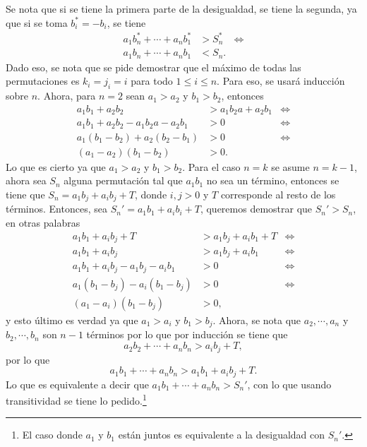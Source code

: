 \documentclass{ayudantia}
\begin{document}
\begin{ans}
    \begin{sol}
        Se nota que si se tiene la primera parte de la desigualdad, se tiene la segunda, ya que si se toma \(b^*_i=-b_i\), se tiene
        \begin{align*}
            a_1b^*_n+\cdots+a_nb^*_1 & >S_n^* & \iff \\
            a_1b_n+\cdots+a_nb_1     & <S_n.
        \end{align*}
        Dado eso, se nota que se pide demostrar que el máximo de todas las permutaciones es \(k_i=j_i=i\) para todo \(1\leq i\leq n\). Para eso, se usará inducción sobre \(n\). Ahora, para \(n=2\) sean \(a_1>a_2\) y \(b_1>b_2\), entonces
        \begin{align*}
            a_1b_1+a_2b_2                & >a_1b_2a+a_2b_1 & \iff \\
            a_1b_1+a_2b_2-a_1b_2a-a_2b_1 & >0              & \iff \\
            a_1(b_1-b_2)+a_2(b_2-b_1)    & >0              & \iff \\
            (a_1-a_2)(b_1-b_2)           & >0.
        \end{align*}
        Lo que es cierto ya que \(a_1>a_2\) y \(b_1>b_2\). Para el caso \(n=k\) se asume \(n=k-1\), ahora sea \(S_n\) alguna permutación tal que \(a_1b_1\) no sea un término, entonces se tiene que \(S_n=a_1b_j+a_ib_j+T\), donde \(i,j>0\) y \(T\) corresponde al resto de los términos. Entonces, sea \(S_n'=a_1b_1+a_ib_i+T\), queremos demostrar que \(S_n'>S_n\), en otras palabras
        \begin{align*}
            a_1b_1+a_ib_j+T&>a_1b_j+a_ib_1+T&\iff\\
            a_1b_1+a_ib_j&>a_1b_j+a_ib_1&\iff\\
            a_1b_1+a_ib_j-a_1b_j-a_ib_1&>0&\iff\\
            a_1(b_1-b_j)-a_i(b_1-b_j)&>0&\iff\\
            (a_1-a_i)(b_1-b_j)&>0,
        \end{align*}
        y esto último es verdad ya que \(a_1>a_i\) y \(b_1>b_j\). Ahora, se nota que \(a_2,\cdots,a_n\) y \(b_2,\cdots,b_n\) son \(n-1\) términos por lo que por inducción se tiene que
        \begin{equation*}
            a_2b_2+\cdots+a_nb_n>a_ib_j+T,
        \end{equation*}
        por lo que
        \begin{equation*}
            a_1b_1+\cdots+a_nb_n>a_1b_1+a_ib_j+T.
        \end{equation*}
        Lo que es equivalente a decir que \(a_1b_1+\cdots+a_nb_n>S_n'\), con lo que usando transitividad se tiene lo pedido.\footnote{El caso donde \(a_1\) y \(b_1\) están juntos es equivalente a la desigualdad con \(S_n'\).}
    \end{sol}
\end{ans}
\end{document}
